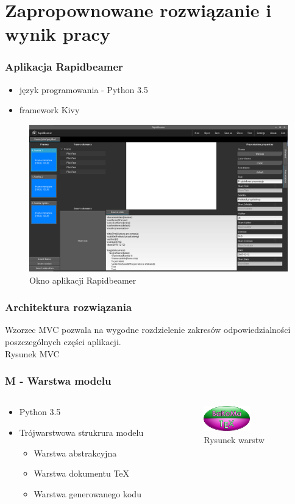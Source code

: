 \documentclass[t]{beamer}
\begin{document}
\section{Zapropownowane rozwiązanie i wynik pracy}

\begin{frame}
	\frametitle{Aplikacja Rapidbeamer}
	\begin{itemize}
		\item język programowania - Python 3.5
		\item framework Kivy
	\end{itemize}
	\begin{figure}[htp]
		\centering
		\includegraphics[width=.80\textwidth]{rapidbeamer.png}
		\caption{Okno aplikacji Rapidbeamer}
		\label{rbm}
	\end{figure}
\end{frame}

\begin{frame}
	\frametitle{Architektura rozwiązania}
	Wzorzec MVC pozwala na wygodne rozdzielenie zakresów odpowiedzialności poszczególnych części aplikacji.\\
	\vfill
	Rysunek MVC
\end{frame}

\begin{frame}
	\frametitle{M - Warstwa modelu}
	\begin{columns}[T]
		\begin{column}{.6\textwidth}
			\begin{itemize}
				\item Python 3.5
				\item Trójwarstwowa strukrura modelu
					\begin{itemize}
						\item Warstwa abstrakcyjna
						\item Warstwa dokumentu \TeX\
						\item Warstwa generowanego kodu
					\end{itemize}
				
			\end{itemize}
		\end{column}
		\begin{column}{.4\textwidth}
			\includegraphics[width=2cm]{bakoma_logo.png}\\
			Rysunek warstw
		\end{column}		
	\end{columns}
\end{frame}
\end{document}
